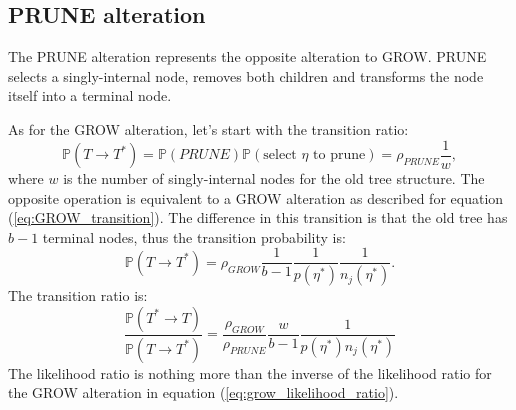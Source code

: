 \documentclass[11pt,a4paper]{article}
\newcommand{\prob}{\mathbb{P}}
\begin{document}
\subsection{PRUNE alteration}
The PRUNE alteration represents the opposite alteration to GROW. PRUNE selects a singly-internal node, removes both children and transforms the node itself into a terminal node.

As for the GROW alteration, let's start with the transition ratio:
\begin{equation}
    \label{eq:prune_transition_ratio}
    \prob(T \to T^*) = \prob({PRUNE})\prob(\text{select } \eta \text{ to prune}) = \rho_{PRUNE}\frac{1}{w},
\end{equation}
where $w$ is the number of singly-internal nodes for the old tree structure.
The opposite operation is equivalent to a GROW alteration as described for equation (\ref{eq:GROW_transition}).
The difference in this transition is that the old tree has $b - 1$ terminal nodes, thus the transition probability is:
\begin{equation}
    \label{eq:PRUNE_transition}
    \prob(T \to T^*)
    = \rho_{GROW}\frac{1}{b - 1}\frac{1}{p(\eta^*)}\frac{1}{n_{j}(\eta^*)}.
\end{equation}
The transition ratio is:
\begin{equation}
    \label{eq:PRUNE_tranition_ratio}
    \frac{ \prob(T^* \to T)  }{ \prob(T \to T^*)  } = \frac{\rho_{GROW}}{\rho_{PRUNE}}\frac{w}{b-1}\frac{1}{p(\eta^*)n_j(\eta^*)}
\end{equation}
The likelihood ratio is nothing more than the inverse of the likelihood ratio for the GROW alteration in equation (\ref{eq:grow_likelihood_ratio}).
\end{document}
